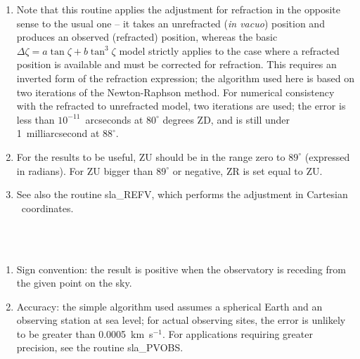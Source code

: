{
}
\notes
{
 \begin{enumerate}
  \item Note that this routine applies the adjustment for refraction in
        the opposite sense to the usual one -- it takes an unrefracted
        ({\it in vacuo}) position and produces an observed (refracted)
        position, whereas the basic
        $\Delta \zeta = a \tan \zeta + b \tan^{3} \zeta$ 
        model strictly
        applies to the case where a refracted position is available and
        must be corrected for refraction.  This requires an inverted form of
        the refraction expression;  the algorithm used here is based on
        two iterations of the Newton-Raphson method.
        For numerical consistency with the
        refracted to unrefracted model, two iterations are used;  the error
        is less than $10^{-11}$~arcseconds at $80^{\circ}$ degrees ZD, and
        is still under 1~milliarcsecond at $88^{\circ}$.
  \item For the results to be useful, ZU should be in the range zero to
        $89^{\circ}$ (expressed in radians).  For ZU bigger than $89^{\circ}$
        or negative, ZR is set equal to ZU.
  \item See also the routine sla\_REFV, which performs the adjustment in
        Cartesian \azel\ coordinates.
 \end{enumerate}
}
{
}
{
  \\
  \\
}
{
}
\notes
{
 \begin{enumerate}
  \item Sign convention: the result is positive when the observatory
        is receding from the given point on the sky.
  \item Accuracy: the simple algorithm used assumes a spherical Earth and
        an observing station at sea level;  for actual observing
        sites, the error is unlikely to be greater than 0.0005~km~s$^{-1}$.
        For applications requiring greater precision, see the routine
        sla\_PVOBS.
 \end{enumerate}
}
